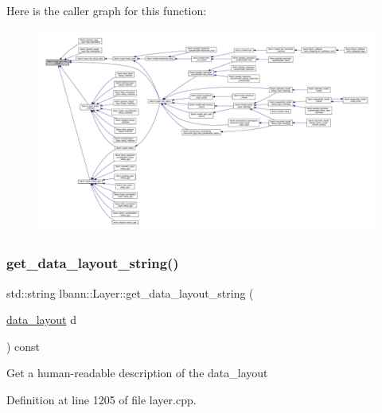 Here is the caller graph for this function\+:\nopagebreak
\begin{figure}[H]
\begin{center}
\leavevmode
\includegraphics[width=350pt]{classlbann_1_1Layer_a5dfb66e81fc085997402a5e2241316bd_icgraph}
\end{center}
\end{figure}
\mbox{\label{classlbann_1_1Layer_ae3f4a5602df821f4221614b1e3782dc1}} 
\subsubsection{\texorpdfstring{get\+\_\+data\+\_\+layout\+\_\+string()}{get\_data\_layout\_string()}}
{\footnotesize\ttfamily std\+::string lbann\+::\+Layer\+::get\+\_\+data\+\_\+layout\+\_\+string (\begin{DoxyParamCaption}\item[{\hyperlink{base_8hpp_a786677cbfb3f5677b4d84f3056eb08db}{data\+\_\+layout}}]{d }\end{DoxyParamCaption}) const}

Get a human-\/readable description of the data\+\_\+layout 

Definition at line 1205 of file layer.\+cpp.


